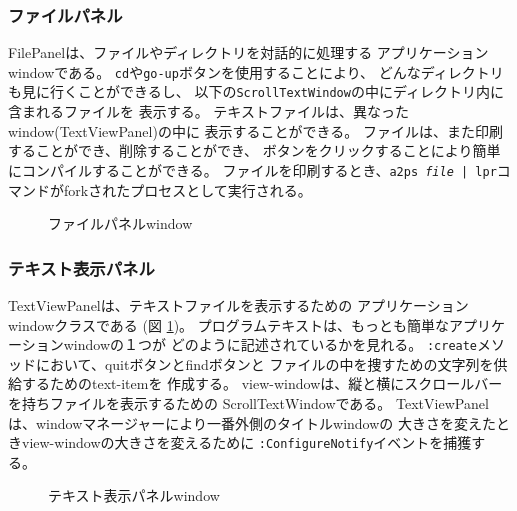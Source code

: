 \subsubsection{ファイルパネル}
FilePanelは、ファイルやディレクトリを対話的に処理する
アプリケーションwindowである。
{\tt cd}や{\tt go-up}ボタンを使用することにより、
どんなディレクトリも見に行くことができるし、
以下の{\tt ScrollTextWindow}の中にディレクトリ内に含まれるファイルを
表示する。
テキストファイルは、異なったwindow(TextViewPanel)の中に
表示することができる。
ファイルは、また印刷することができ、削除することができ、
ボタンをクリックすることにより簡単にコンパイルすることができる。
ファイルを印刷するとき、{\tt a2ps {\em file} | lpr}コマンドがforkされたプロセスとして実行される。

\begin{figure}
\begin{center}
\end{center}
\caption{ファイルパネルwindow}
\end{figure}

\subsubsection{テキスト表示パネル}

TextViewPanelは、テキストファイルを表示するための
アプリケーションwindowクラスである
(図 \ref{textviewpanel})。
プログラムテキストは、もっとも簡単なアプリケーションwindowの１つが
どのように記述されているかを見れる。
{\tt :create}メソッドにおいて、quitボタンとfindボタンと
ファイルの中を捜すための文字列を供給するためのtext-itemを
作成する。
view-windowは、縦と横にスクロールバーを持ちファイルを表示するための
ScrollTextWindowである。
TextViewPanelは、windowマネージャーにより一番外側のタイトルwindowの
大きさを変えたときview-windowの大きさを変えるために
{\tt :ConfigureNotify}イベントを捕獲する。

\begin{figure}
\begin{center}
\end{center}
\caption{テキスト表示パネルwindow\label{textviewpanel}}
\end{figure}


